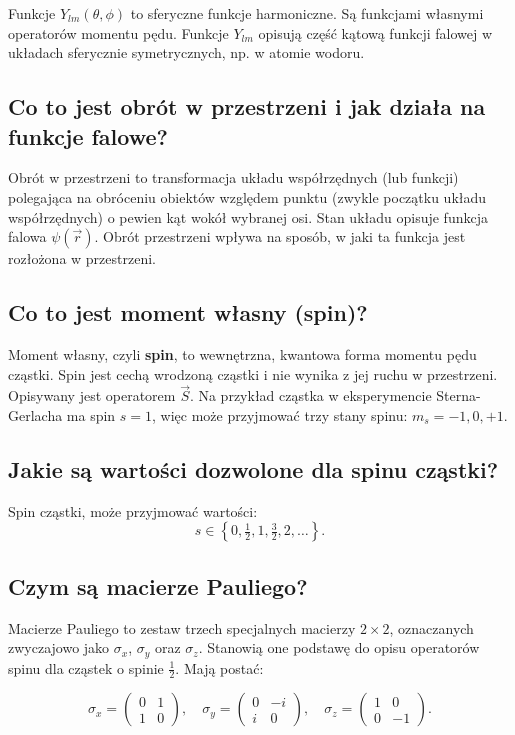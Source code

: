 Funkcje \( Y_{lm}(\theta, \phi) \) to sferyczne funkcje harmoniczne. Są funkcjami własnymi operatorów momentu pędu. Funkcje \( Y_{lm} \) opisują część kątową funkcji falowej w układach sferycznie symetrycznych, np. w atomie wodoru.

\subsection{Co to jest obrót w przestrzeni i jak działa na funkcje falowe?}

Obrót w przestrzeni to transformacja układu współrzędnych (lub funkcji) polegająca na obróceniu obiektów względem punktu (zwykle początku układu współrzędnych) o pewien kąt wokół wybranej osi. Stan układu opisuje funkcja falowa $\psi(\vec{r})$. Obrót przestrzeni wpływa na sposób, w jaki ta funkcja jest rozłożona w przestrzeni.

\subsection{Co to jest moment własny (spin)?}

Moment własny, czyli \textbf{spin}, to wewnętrzna, kwantowa forma momentu pędu cząstki. Spin jest cechą wrodzoną cząstki i nie wynika z jej ruchu w przestrzeni. Opisywany jest operatorem $\vec{S}$. Na przykład cząstka w eksperymencie Sterna-Gerlacha ma spin \( s = 1 \), więc może przyjmować trzy stany spinu: \( m_s = -1, 0, +1 \).

\subsection{Jakie są wartości dozwolone dla spinu cząstki?}

Spin cząstki, może przyjmować wartości:
\[
s \in \left\{ 0, \tfrac{1}{2}, 1, \tfrac{3}{2}, 2, \dots \right\}.
\]

\subsection{Czym są macierze Pauliego?}

Macierze Pauliego to zestaw trzech specjalnych macierzy \( 2 \times 2 \), oznaczanych zwyczajowo jako \( \sigma_x \), \( \sigma_y \) oraz \( \sigma_z \). Stanowią one podstawę do opisu operatorów spinu dla cząstek o spinie \( \frac{1}{2} \). Mają postać:

\[
\sigma_x = \begin{pmatrix}
0 & 1 \\
1 & 0
\end{pmatrix}, \quad
\sigma_y = \begin{pmatrix}
0 & -i \\
i & 0
\end{pmatrix}, \quad
\sigma_z = \begin{pmatrix}
1 & 0 \\
0 & -1
\end{pmatrix}.
\]

